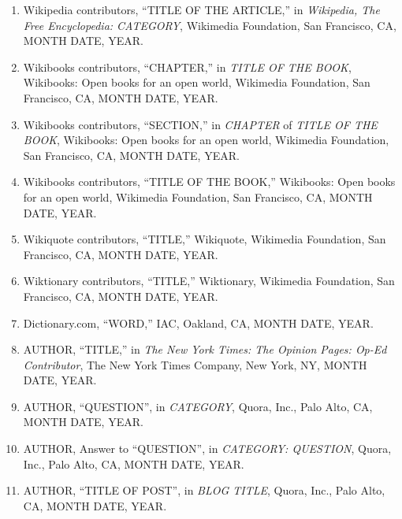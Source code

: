 \begin{enumerate}
\item Wikipedia contributors, ``TITLE OF THE ARTICLE,'' in {\it Wikipedia, The Free Encyclopedia: CATEGORY}, Wikimedia Foundation, San Francisco, CA, MONTH DATE, YEAR.
\item Wikibooks contributors, ``CHAPTER,'' in {\it TITLE OF THE BOOK}, Wikibooks: Open books for an open world, Wikimedia Foundation, San Francisco, CA, MONTH DATE, YEAR.
\item Wikibooks contributors, ``SECTION,'' in {\it CHAPTER} of {\it TITLE OF THE BOOK}, Wikibooks: Open books for an open world, Wikimedia Foundation, San Francisco, CA, MONTH DATE, YEAR.
\item Wikibooks contributors, ``TITLE OF THE BOOK,'' Wikibooks: Open books for an open world, Wikimedia Foundation, San Francisco, CA, MONTH DATE, YEAR.
\item Wikiquote contributors, ``TITLE,'' Wikiquote, Wikimedia Foundation, San Francisco, CA, MONTH DATE, YEAR.
\item Wiktionary contributors, ``TITLE,'' Wiktionary, Wikimedia Foundation, San Francisco, CA, MONTH DATE, YEAR.
\item Dictionary.com, ``WORD,'' IAC, Oakland, CA, MONTH DATE, YEAR.
\item AUTHOR, ``TITLE,'' in {\it The New York Times: The Opinion Pages: Op-Ed Contributor}, The New York Times Company, New York, NY, MONTH DATE, YEAR.
\item AUTHOR, ``QUESTION'', in {\it CATEGORY}, Quora, Inc., Palo Alto, CA, MONTH DATE, YEAR.
\item AUTHOR, Answer to ``QUESTION'', in {\it CATEGORY: QUESTION}, Quora, Inc., Palo Alto, CA, MONTH DATE, YEAR.
\item AUTHOR, ``TITLE OF POST'', in {\it BLOG TITLE}, Quora, Inc., Palo Alto, CA, MONTH DATE, YEAR.
\end{enumerate}


